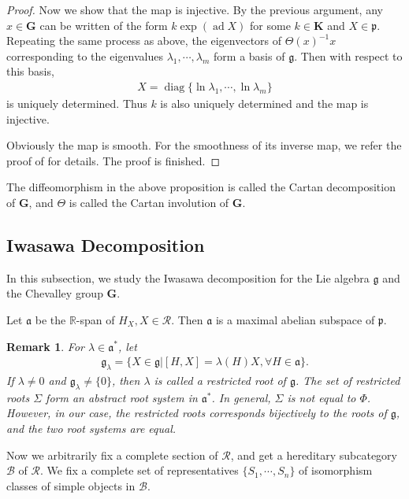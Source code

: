 \documentclass[10pt,a4paper]{amsart}
\newtheorem{remark}[theorem]{Remark}
\begin{document}
\begin{proof}
Now we show that the map is injective.
By the previous argument, any $x\in \mathbf{G}$ can be written of the form $k\operatorname{exp}(\operatorname{ad}X)$ for some $k\in \mathbf{K}$ and $X\in \mathfrak{p}$. 
Repeating the same process as above, the eigenvectors of $\Theta(x)^{-1}x$ corresponding to the eigenvalues $\lambda_1,\cdots,\lambda_m$ form a basis of $\mathfrak{g}$.
Then with respect to this basis,
\begin{align*}
   X=\operatorname{diag}\{\operatorname{ln}\lambda_1,\cdots,\operatorname{ln}\lambda_m\}
\end{align*}
 is uniquely determined.
Thus $k$ is also uniquely determined and the map is injective.

Obviously the map is smooth. For the smoothness of its inverse map, we refer the proof of \cite[Theorem 6.31]{Knapp} for details.
The proof is finished.
\end{proof}

The diffeomorphism in the above proposition is called the Cartan decomposition of $\mathbf{G}$, and $\Theta$ is called the Cartan involution of $\mathbf{G}$.




\subsection{Iwasawa Decomposition}
In this subsection, we study the Iwasawa decomposition for the Lie algebra $\mathfrak{g}$ and the Chevalley group $\mathbf{G}$.

Let $\mathfrak{a}$ be the $\mathbb{R}$-span of $H_X,X\in \mathcal{R}$. 
Then $\mathfrak{a}$ is a maximal abelian subspace of $\mathfrak{p}$.

\begin{remark}
    For $\lambda\in\mathfrak{a}^*$, let 
    \begin{align*}
        \mathfrak{g}_{\lambda}=\{X\in \mathfrak{g}|[H,X]=\lambda(H)X, \forall H\in \mathfrak{a}  \}.
    \end{align*}
    If $\lambda\neq 0$ and $\mathfrak{g}_{\lambda}\neq \{0\}$, then $\lambda$ is called a restricted root of $\mathfrak{g}$.
    The set of restricted roots $\Sigma$ form an abstract root system in $\mathfrak{a}^*$.
    In general, $\Sigma$ is not equal to $\Phi$.
    However, in our case, the restricted roots corresponds bijectively to the roots of $\mathfrak{g}$, and the two root systems are equal.
\end{remark}

Now we arbitrarily fix a complete section of $\mathcal{R}$, and get a hereditary subcategory $\mathcal{B}$ of $\mathcal{R}$.
We fix a complete set of representatives $\{S_1,\cdots,S_n\}$ of isomorphism classes of simple objects in $\mathcal{B}$.
\end{document}
